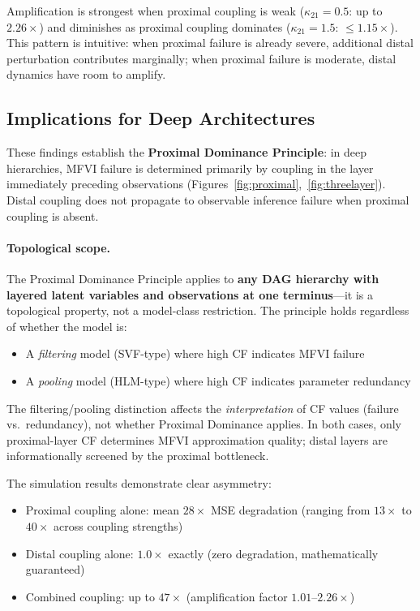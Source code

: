 \documentclass[10pt]{article} %
\theoremstyle{plain}
\theoremstyle{definition}
\begin{document}
\noindent Amplification is strongest when proximal coupling is weak ($\kappa_{21} = 0.5$: up to $2.26\times$) and diminishes as proximal coupling dominates ($\kappa_{21} = 1.5$: $\leq 1.15\times$). This pattern is intuitive: when proximal failure is already severe, additional distal perturbation contributes marginally; when proximal failure is moderate, distal dynamics have room to amplify.

\subsection{Implications for Deep Architectures}

These findings establish the \textbf{Proximal Dominance Principle}: in deep hierarchies, MFVI failure is determined primarily by coupling in the layer immediately preceding observations (Figures~\ref{fig:proximal},~\ref{fig:threelayer}). Distal coupling does not propagate to observable inference failure when proximal coupling is absent.

\paragraph{Topological scope.} The Proximal Dominance Principle applies to \textbf{any DAG hierarchy with layered latent variables and observations at one terminus}---it is a topological property, not a model-class restriction. The principle holds regardless of whether the model is:
\begin{itemize}
    \item A \emph{filtering} model (SVF-type) where high CF indicates MFVI failure
    \item A \emph{pooling} model (HLM-type) where high CF indicates parameter redundancy
\end{itemize}
The filtering/pooling distinction affects the \emph{interpretation} of CF values (failure vs.\ redundancy), not whether Proximal Dominance applies. In both cases, only proximal-layer CF determines MFVI approximation quality; distal layers are informationally screened by the proximal bottleneck.

The simulation results demonstrate clear asymmetry:
\begin{itemize}
    \item Proximal coupling alone: mean $28\times$ MSE degradation (ranging from $13\times$ to $40\times$ across coupling strengths)
    \item Distal coupling alone: $1.0\times$ exactly (zero degradation, mathematically guaranteed)
    \item Combined coupling: up to $47\times$ (amplification factor $1.01$--$2.26\times$)
\end{itemize}
\end{document}
